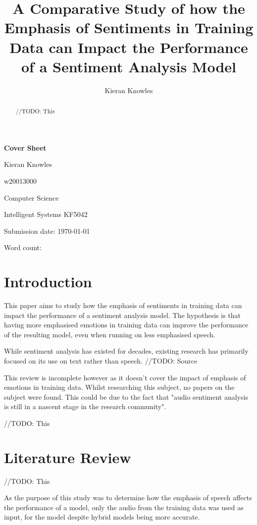 \documentclass[journal]{IEEEtran}
\newcommand\wordcount{
    
}
\begin{document}
{\Large \textbf{Cover Sheet}}

Kieran Knowles

w20013000

Computer Science

Intelligent Systems KF5042

Submission date: \today

Word count: \wordcount

\title{A Comparative Study of how the Emphasis of Sentiments in Training Data can Impact the Performance of a Sentiment Analysis Model}
\author{Kieran Knowles}
\maketitle


\begin{abstract}
    //TODO: This

\end{abstract}

\section{Introduction}
This paper aims to study how the emphasis of sentiments in training data can impact the performance of a sentiment analysis
model. The hypothesis is that having more emphasised emotions in training data can improve the performance of the resulting
model, even when running on less emphasised speech.

While sentiment analysis has existed for decades, existing research has primarily focused on
its use on text rather than speech. //TODO: Source

This review is incomplete however as it doesn't cover the impact of emphasis of emotions in training data.
Whilst researching this subject, no papers on the subject were found.
This could be due to the fact that "audio sentiment analysis is still in a nascent stage
in the research community". \cite{maghilnan_sentiment_2017}

//TODO: This

\section{Literature Review}

//TODO: This

As the purpose of this study was to determine how the emphasis of speech affects
the performance of a model, only the audio from the training data was used as input,
for the model despite hybrid models being more accurate. \cite{bhaskar_hybrid_2015}
\end{document}
